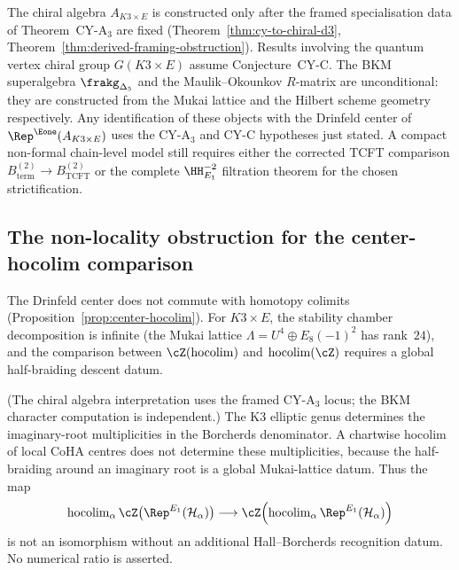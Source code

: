 \begin{remark}
\label{rem:k3e-conditional}
The chiral algebra \(A_{K3 \times E}\) is constructed only after the
framed specialisation data of Theorem~CY-A$_3$ are fixed
(Theorem~\ref{thm:cy-to-chiral-d3},
Theorem~\ref{thm:derived-framing-obstruction}). Results involving
the quantum vertex chiral group $G(K3 \times E)$ assume
Conjecture~CY-C. The BKM superalgebra
$\frakg_{\Delta_5}$ and the Maulik--Okounkov $R$-matrix are
unconditional: they are constructed from the Mukai lattice and
the Hilbert scheme geometry respectively. Any identification of these
objects with the Drinfeld center of
$\Rep^{\Eone}(A_{K3 \times E})$ uses the CY-A$_3$ and CY-C hypotheses
just stated. A compact non-formal chain-level model still requires
either the corrected TCFT comparison
$B_{\mathrm{term}}^{(2)}\to B_{\mathrm{TCFT}}^{(2)}$ or the complete
$\HH^{-2}_{E_1}$ filtration theorem for the chosen strictification.
\end{remark}


\subsection{The non-locality obstruction for the center-hocolim comparison}
\label{subsec:k3e-nonlocality}

The Drinfeld center does not commute with homotopy colimits
(Proposition~\ref{prop:center-hocolim}). For $K3 \times E$,
the stability chamber decomposition is infinite (the Mukai
lattice $\Lambda = U^4 \oplus E_8(-1)^2$ has rank~$24$), and
the comparison between \(\cZ(\operatorname{hocolim})\) and
\(\operatorname{hocolim}(\cZ)\) requires a global half-braiding
descent datum.

\begin{proposition}
\label{prop:k3e-nonlocality-quantification}
\textup{(}The chiral algebra interpretation uses the framed
CY-A$_3$ locus; the BKM character
computation is independent.\textup{)}
The K3 elliptic genus determines the imaginary-root multiplicities in
the Borcherds denominator. A chartwise hocolim of local CoHA centres
does not determine these multiplicities, because the half-braiding
around an imaginary root is a global Mukai-lattice datum. Thus the
map
\[
 \operatorname{hocolim}_\alpha \cZ\bigl(\Rep^{E_1}(\mathcal H_\alpha)\bigr)
 \longrightarrow
 \cZ\!\left(\operatorname{hocolim}_\alpha \Rep^{E_1}(\mathcal H_\alpha)\right)
\]
is not an isomorphism without an additional Hall--Borcherds recognition
datum. No numerical ratio is asserted.
\end{proposition}

